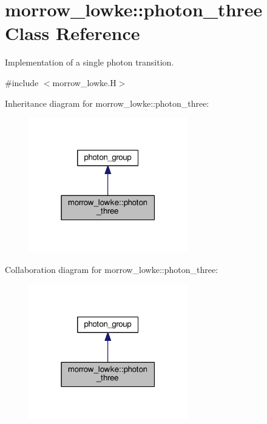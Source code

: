 \hypertarget{classmorrow__lowke_1_1photon__three}{}\section{morrow\+\_\+lowke\+:\+:photon\+\_\+three Class Reference}
\label{classmorrow__lowke_1_1photon__three}


Implementation of a single photon transition.  




{\ttfamily \#include $<$morrow\+\_\+lowke.\+H$>$}



Inheritance diagram for morrow\+\_\+lowke\+:\+:photon\+\_\+three\+:\nopagebreak
\begin{figure}[H]
\begin{center}
\leavevmode
\includegraphics[width=195pt]{classmorrow__lowke_1_1photon__three__inherit__graph}
\end{center}
\end{figure}


Collaboration diagram for morrow\+\_\+lowke\+:\+:photon\+\_\+three\+:\nopagebreak
\begin{figure}[H]
\begin{center}
\leavevmode
\includegraphics[width=195pt]{classmorrow__lowke_1_1photon__three__coll__graph}
\end{center}
\end{figure}
